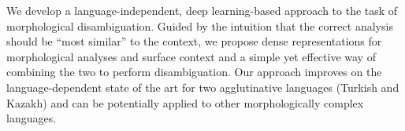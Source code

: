 We develop a language-independent, deep learning-based approach to the task of morphological disambiguation. Guided by the intuition that the correct analysis should be ``most similar'' to the context, we propose dense representations for morphological analyses and surface context and a simple yet effective way of combining the two to perform disambiguation. Our approach improves on the language-dependent state of the art for two agglutinative languages (Turkish and Kazakh) and can be potentially applied to other morphologically complex languages.
